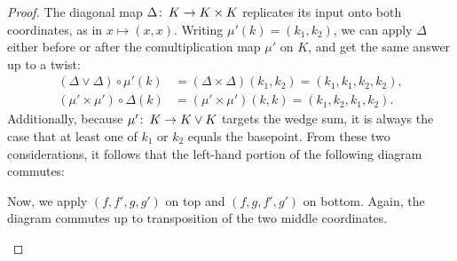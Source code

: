 \begin{proof}
The diagonal map $\Delta\colon\thinspace K \to K \times K$ replicates its input onto both coordinates, as in $x \mapsto (x, x)$.
Writing $\mu'(k) = (k_1, k_2)$, we can apply $\Delta$ either before or after the comultiplication map $\mu'$ on $K$, and get the same answer up to a twist:
\begin{align*}
(\Delta \vee \Delta) \circ \mu'(k) & = (\Delta \times \Delta)(k_1, k_2) = (k_1, k_1, k_2, k_2), \\
(\mu' \times \mu') \circ \Delta(k) & = (\mu' \times \mu')(k, k) = (k_1, k_2, k_1, k_2).
\end{align*}
Additionally, because $\mu'\colon\thinspace K \to K \vee K$ targets the wedge sum, it is always the case that at least one of $k_1$ or $k_2$ equals the basepoint.
From these two considerations, it follows that the left-hand portion of the following diagram commutes:
\begin{center}
\end{center}
Now, we apply $(f, f', g, g')$ on top and $(f, g, f', g')$ on bottom.
Again, the diagram commutes up to transposition of the two middle coordinates.
\begin{center}
\end{center}
\end{proof}
